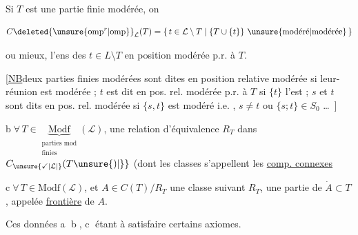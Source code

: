 

Si $T$ est une partie finie
modérée\unsure{,|;}, on  

\[
 C\deleted{\unsure{\mathrm{omp}^{r}|\mathrm{omp}}}_{\mathcal L}(T)=
 \{\,t\in\mathcal L\setminus T\mid \{T\cup\{t\}\}\ \text{\unsure{modéré|modérée}}\,\}
\]


ou mieux, l'ens des $t\in L\setminus T$ en
position modérée p.r. à $T$.

[\uline{NB}\quad deux parties finies modérées
sont dites en position relative
modérée si leur-réunion est
modérée ; $t$ est dit en pos. rel.
modérée p.r. à $T$ si $\{t\}$ l'est ;
$s$ et $t$ sont dits en pos. rel. modérée
si $\{s,t\}$ est modéré i.e. ,
$s\ne t$ ou $\{s;t\}\in S_0$ \ldots\ ]


\textcircled{\scriptsize b}\quad $\forall\,T\in\underbrace{\mathrm{Modf}}_{\substack{\text{parties mod}\\\text{finies}}}(\mathcal L)$, une relation
d'équivalence $R_T$ dans $C_{\unsure{\checkmark|\mathcal L|}}(T\unsure{)|\}}$ (dont
les classes s'appellent les \uline{comp. connexes} 


\textcircled{\scriptsize c}\quad $\forall\,T\in\mathrm{Modf}(\mathcal L)$, et $A\in C(T)/R_T$
une classe suivant $R_T$, une partie
de $\dot A\subset T$, appelée \uline{frontière} de $A$.

Ces données \textcircled{\scriptsize a} \textcircled{\scriptsize b}, \textcircled{\scriptsize c} étant 
à satisfaire certains axiomes.

